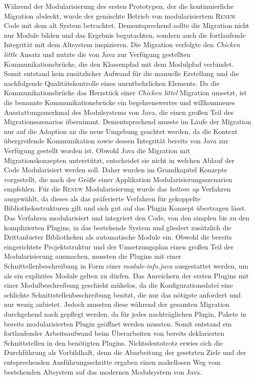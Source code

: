 Während der Modularisierung des ersten Prototypen, der die kontinuierliche Migration abdeckt, wurde der gemischte Betrieb von modularisiertem \textsc{Renew} Code mit dem alt System betrachtet. Dementsprechend sollte die Migration nicht nur Module bilden und das Ergebnis begutachten, sondern auch die fortlaufende Integrität mit dem Altsystem inspizieren.\newline
Die Migration verfolgte den \textit{Chicken little} Ansatz und nutzte die von Java zur Verfügung gestellten Kommunikationsbrücke, die den Klassenpfad mit dem Modulpfad verbindet. Somit entstand kein zusätzlicher Aufwand für die manuelle Erstellung und die nachfolgende Qualitätskontrolle eines unentbehrlichen Elements. Da die Kommunikationsbrücke das Herzstück einer \textit{Chicken littel} Migration umsetzt, ist die benannte Kommunikationsbrücke ein begehrenswertes und willkommenes Ausstattungsmerkmal des Modulsystems von Java, die einen großen Teil des Migrationsszenarios übernimmt. Dementsprechend musste im Laufe der Migration nur auf die Adaption an die neue Umgebung geachtet werden, da die Kontext übergreifende Kommunikation sowie dessen Integrität bereits von Java zur Verfügung gestellt worden ist. \newline
Obwohl Java die Migration mit Migrationskonzepten unterstützt, entscheidet sie nicht in welchen Ablauf der Code Modularisiert werden soll. Daher wurden im Grundkapitel Konzepte vorgestellt, die nach der Größe einer Applikation Modularisierungsszenarien empfehlen. Für die \textsc{Renew} Modularisierung wurde das \textit{bottom up} Verfahren ausgewählt, da dieses als das präferierte Verfahren für gekoppelte Bibliotheksstrukturen gilt und sich gut auf das Plugin Konzept übertragen lässt. Das Verfahren modularisiert und integriert den Code, von den simplen bis zu den komplizierten Plugins, in das bestehende System und gliedert zusätzlich die Drittanbieter Bibliotheken als automatische Module ein.\newline 
Obwohl die bereits eingerichtete Projektstruktur und der Umsetzungsplan einen großen Teil der Modularisierung ausmachen, mussten die Plugins mit einer Schnittellenbeschreibung in Form einer \textit{module-info.java} ausgestattet werden, um als ein explizites Module gelten zu dürfen. Das Anreichern der ersten Plugins mit einer Modulbeschreibung geschieht mühelos, da die Konfigurationsdatei eine schlichte Schnittstellenbeschreibung besitzt, die nur das nötigste anfordert und nur wenig anbietet. Jedoch mussten diese während der gesamten Migration durchgehend nach gepflegt werden, da für jedes nachträglichen Plugin, Pakete in bereits modularisierten Plugin geöffnet werden mussten. Somit entstand ein fortlaufender Arbeitsaufwand beim Überarbeiten von bereits deklarierten Schnittstellen in den benötigten Plugins.\newline
Nichtsdestotrotz erwies sich die Durchführung als Vorbildhaft, denn die Abarbeitung der gesetzten Ziele und der entsprechenden Ausführungsschritte ergaben einen makellosen Weg vom bestehenden Altsystem auf das modernen Modulsystem von Java.\bigbreak

